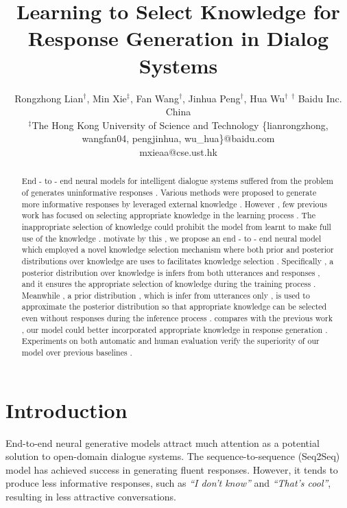 \documentclass{article}
\title{Learning to Select Knowledge for Response Generation in Dialog Systems}
\author{
Rongzhong Lian$^\dag$, Min Xie$^\ddag$, Fan Wang$^\dag$, Jinhua Peng$^\dag$, Hua Wu$^\dag$
\affiliations
  $^\dag$ Baidu Inc. China \\
  $^\ddag$The Hong Kong University of Science and Technology
\emails
  {\{lianrongzhong, wangfan04, pengjinhua, wu\_hua\}@baidu.com} \\
  mxieaa@cse.ust.hk
  }
\newcommand\blfootnote[1]{%
  \begingroup
  \renewcommand\thefootnote{}\footnote{#1}%
  \addtocounter{footnote}{-1}%
  \endgroup
}
\begin{document}
\maketitle
\begin{abstract}
End - to - end neural models for intelligent dialogue systems suffered from the problem of generates uninformative responses . Various methods were proposed to generate more informative responses by leveraged external knowledge . However , few previous work has focused on selecting appropriate knowledge in the learning process . The inappropriate selection of knowledge could prohibit the model from learnt to make full use of the knowledge . motivate by this , we propose an end - to - end neural model which employed a novel knowledge selection mechanism where both prior and posterior distributions over knowledge are uses to facilitates knowledge selection . Specifically , a posterior distribution over knowledge is infers from both utterances and responses , and it ensures the appropriate selection of knowledge during the training process . Meanwhile , a prior distribution , which is infer from utterances only , is used to approximate the posterior distribution so that appropriate knowledge can be selected even without responses during the inference process . compares with the previous work , our model could better incorporated appropriate knowledge in response generation . Experiments on both automatic and human evaluation verify the superiority of our model over previous baselines . \end{abstract}


\section{Introduction}
End-to-end neural generative models attract much attention as a potential solution to open-domain dialogue systems.
The sequence-to-sequence (Seq2Seq) model \cite{shang2015neural,vinyals2015neural,cho2014learning} has achieved success in generating fluent responses. 
However, it tends to produce less informative responses, such as \textit{``I don't know''} and \textit{``That's cool''}, resulting in less attractive conversations. 
\end{document}
